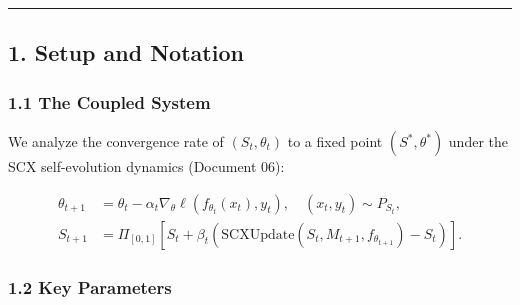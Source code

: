 \documentclass[
  12pt,
]{article}
\begin{document}
\begin{center}\rule{0.5\linewidth}{0.5pt}\end{center}

\subsection{1. Setup and Notation}\label{setup-and-notation}

\subsubsection{1.1 The Coupled System}\label{the-coupled-system}

We analyze the convergence rate of \((S_t, \theta_t)\) to a fixed point
\((S^*, \theta^*)\) under the SCX self-evolution dynamics (Document 06):

\[\begin{aligned}
\theta_{t+1} &= \theta_t - \alpha_t \nabla_\theta \ell(f_{\theta_t}(x_t), y_t), \quad (x_t, y_t) \sim P_{S_t}, \\
S_{t+1} &= \Pi_{[0,1]}[S_t + \beta_t (\text{SCXUpdate}(S_t, M_{t+1}, f_{\theta_{t+1}}) - S_t)].
\end{aligned}\]

\subsubsection{1.2 Key Parameters}\label{key-parameters}
\end{document}
